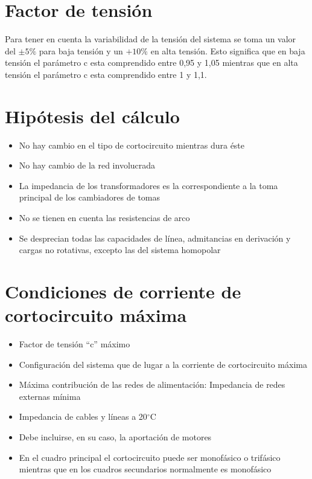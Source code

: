 \section{Factor de tensión}
Para tener en cuenta la variabilidad de la tensión del sistema se toma un valor del $\pm5\%$ para baja tensión y un $+10\%$ en alta tensión. Esto significa que en baja tensión el parámetro c esta comprendido entre 0,95 y 1,05 mientras que en alta tensión el parámetro c esta comprendido entre 1 y 1,1.
\section{Hipótesis del cálculo}
\begin{itemize}
	\item No hay cambio en el tipo de cortocircuito mientras dura éste
	\item No hay cambio de la red involucrada
	\item La impedancia de los transformadores es la correspondiente a la toma principal de los cambiadores de tomas
	\item No se tienen en cuenta las resistencias de arco
	\item Se desprecian todas las capacidades de línea, admitancias en derivación y cargas no rotativas, excepto las del sistema homopolar
\end{itemize}
\section{Condiciones de corriente de cortocircuito máxima}
\begin{itemize}
	\item Factor de tensión “c” máximo
	\item Configuración del sistema que de lugar a la corriente de cortocircuito máxima
	\item Máxima contribución de las redes de alimentación: Impedancia de redes externas mínima
	\item Impedancia de cables y líneas a 20$^\circ$C
	\item Debe incluirse, en su caso, la aportación de motores
	\item En el cuadro principal el cortocircuito puede ser monofásico o trifásico mientras que en los cuadros secundarios normalmente es monofásico
\end{itemize}
